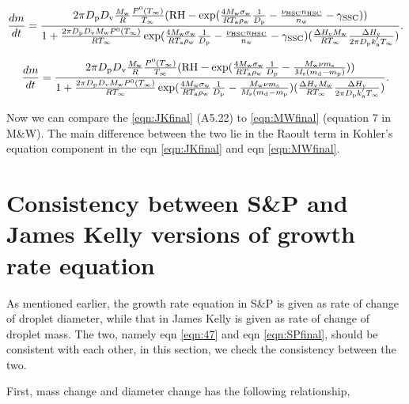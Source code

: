 \documentclass[12pt]{article}
\begin{document}
\begin{equation}\label{eqn:JKfinal}
\frac{dm}{dt}= \frac{2 \pi D_{\rm p} D_{\rm v}  \frac{M_{\rm w}}{R} \frac{P^{\rm 0}(T_{\infty})} {T_{\infty}} 
(\textrm{RH} - \exp(\frac{4 M_{\rm w}\sigma_{\rm w}}{R T_{\rm a} \rho_{\rm w}} \frac{1}{D_{\rm p}}- \frac{\nu_{\rm HSC}n_{\rm HSC}} {n_{\rm w}}-\gamma_{\rm SSC}))}{1+\frac{2 \pi D_{\rm p} D_{\rm v} M_{\rm w} P^{\rm 0}(T_{\infty})}{R T_{\infty}} \exp(\frac{4 M_{\rm w}\sigma_{\rm w}}{R T_{\rm a} \rho_{\rm w}} \frac{1}{D_{\rm p}}- \frac{\nu_{\rm HSC}n_{\rm HSC}} {n_{\rm w}}-\gamma_{\rm SSC})(\frac{\Delta H_{\rm v} M_{\rm w}} {R T_{\infty}}\frac{\Delta H_{\rm v}}{2 \pi D_{\rm p} k^{'}_{\rm a} T_{\infty}})}. 
\end{equation}


\begin{equation}\label{eqn:MWfinal}
\frac{dm}{dt}= \frac{2 \pi D_{\rm p} D_{\rm v}  \frac{M_{\rm w}}{R} \frac{P^{\rm 0}(T_{\infty})} {T_{\infty}} 
(\textrm{RH} - \exp( \frac{4 M_{\rm w}\sigma_{\rm w}}{R T_{\rm a} \rho_{\rm w}} 
\frac{1}{D_{\rm p}}-\frac{ M_{\rm w} \nu m_{\rm s}}{M_{\rm s} (m_{\rm d}-m_{\rm p})}))}{1+\frac{2 \pi D_{\rm p} D_{\rm v} M_{\rm w} P^{\rm 0}(T_{\infty})}{R T_{\infty}} \exp(\frac{4 M_{\rm w}\sigma_{\rm w}}{R T_{\rm a} \rho_{\rm w}}\frac{1}{D_{\rm p}}-\frac{ M_{\rm w} \nu m_{\rm s}}{M_{\rm s} (m_{\rm d}-m_{\rm p}}) (\frac{\Delta H_{\rm v} M_{\rm w}} {R T_{\infty}}\frac{\Delta H_{\rm v}}{2 \pi D_{\rm p} k^{'}_{\rm a} T_{\infty}})}. 
\end{equation}

Now we can compare the \ref{eqn:JKfinal} (A5.22) to \ref{eqn:MWfinal} (equation 7 in M\&W). The main difference between the two lie in the Raoult term in Kohler's equation component in the eqn \ref{eqn:JKfinal} and eqn \ref{eqn:MWfinal}. 


\section{Consistency between S\&P and James Kelly versions of growth rate equation}

As mentioned earlier,  the growth rate equation in S\&P is given as rate of change of droplet diameter, while that in James Kelly is given as rate of change of droplet mass.  The two, namely eqn \ref{eqn:47} and eqn \ref{eqn:SPfinal}, should be consistent with each other, in this section, we check the consistency between the two.

First, mass change and diameter change has the following relationship,
\end{document}
